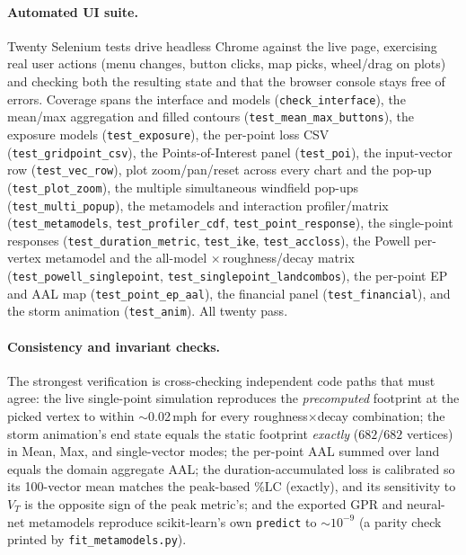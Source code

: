 \documentclass[11pt]{article}
\begin{document}
\paragraph{Automated UI suite.}
Twenty Selenium tests drive headless Chrome against the live page, exercising real
user actions (menu changes, button clicks, map picks, wheel/drag on plots) and
checking both the resulting state and that the browser console stays free of errors.
Coverage spans the interface and models (\texttt{check\_interface}), the mean/max
aggregation and filled contours (\texttt{test\_mean\_max\_buttons}), the exposure
models (\texttt{test\_exposure}), the per-point loss CSV (\texttt{test\_gridpoint\_csv}),
the Points-of-Interest panel (\texttt{test\_poi}), the input-vector row
(\texttt{test\_vec\_row}), plot zoom/pan/reset across every chart and the pop-up
(\texttt{test\_plot\_zoom}), the multiple simultaneous windfield pop-ups
(\texttt{test\_multi\_popup}), the metamodels and interaction profiler/matrix
(\texttt{test\_metamodels}, \texttt{test\_profiler\_cdf}, \texttt{test\_point\_response}),
the single-point responses (\texttt{test\_duration\_metric}, \texttt{test\_ike},
\texttt{test\_accloss}), the Powell per-vertex metamodel and the all-model
$\times$\,roughness/decay matrix (\texttt{test\_powell\_singlepoint},
\texttt{test\_singlepoint\_landcombos}), the per-point EP and AAL map
(\texttt{test\_point\_ep\_aal}), the financial panel (\texttt{test\_financial}), and
the storm animation (\texttt{test\_anim}). All twenty pass.

\paragraph{Consistency and invariant checks.}
The strongest verification is cross-checking independent code paths that must agree:
the live single-point simulation reproduces the \emph{precomputed} footprint at the
picked vertex to within $\sim$0.02\,mph for every roughness$\times$decay combination;
the storm animation's end state equals the static footprint \emph{exactly}
($682/682$ vertices) in Mean, Max, and single-vector modes; the per-point AAL summed
over land equals the domain aggregate AAL; the duration-accumulated loss is
calibrated so its 100-vector mean matches the peak-based \%LC (exactly), and its
sensitivity to $V_T$ is the opposite sign of the peak metric's; and the exported GPR
and neural-net metamodels reproduce scikit-learn's own \texttt{predict} to
$\sim\!10^{-9}$ (a parity check printed by \texttt{fit\_metamodels.py}).
\end{document}
